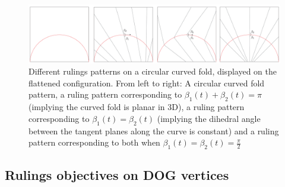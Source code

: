 \begin{figure} [h]
	\centering
	\includegraphics[width=\linewidth]{figures/curved_different_rullings}
	\caption{Different rulings patterns on a circular curved fold, displayed on the flattened configuration. From left to right: A circular curved fold pattern, a ruling pattern corresponding to $\beta_1(t)+\beta_2(t)=\pi$ (implying the curved fold is planar in 3D), a ruling pattern corresponding to $\beta_1(t)=\beta_2(t)$ (implying the dihedral angle between the tangent planes along the curve is constant) and a ruling pattern corresponding to both when $\beta_1(t)=\beta_2(t)=\frac{\pi}{2}$}
	\label{fig:curved_different_rullings}
\end{figure}

\subsection{Rulings objectives on DOG vertices}
